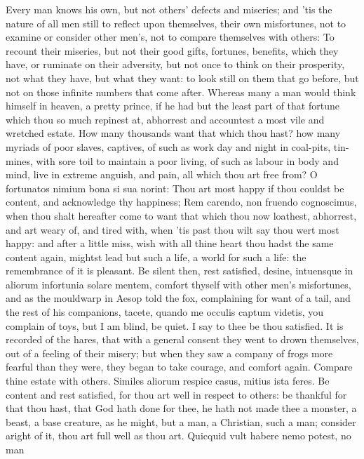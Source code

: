{Every man knows his own, but not others' defects and miseries;
and 'tis the nature of all men still to reflect upon themselves, their
own misfortunes, not to examine or consider other men's, not to compare
themselves with others: To recount their miseries, but not their good
gifts, fortunes, benefits, which they have, or ruminate on their
adversity, but not once to think on their prosperity, not what they
have, but what they want: to look still on them that go before, but not
on those infinite numbers that come after. Whereas many a man
would think himself in heaven, a pretty prince, if he had but the least
part of that fortune which thou so much repinest at, abhorrest and
accountest a most vile and wretched estate. How many thousands want
that which thou hast? how many myriads of poor slaves, captives, of
such as work day and night in coal-pits, tin-mines, with sore toil to
maintain a poor living, of such as labour in body and mind, live in
extreme anguish, and pain, all which thou art free from? O fortunatos
nimium bona si sua norint: Thou art most happy if thou couldst be
content, and acknowledge thy happiness; Rem carendo, non fruendo
cognoscimus, when thou shalt hereafter come to want that which thou now
loathest, abhorrest, and art weary of, and tired with, when 'tis past
thou wilt say thou wert most happy: and after a little miss, wish with
all thine heart thou hadst the same content again, mightst lead but
such a life, a world for such a life: the remembrance of it is
pleasant. Be silent then, rest satisfied, desine, intuensque in
aliorum infortunia solare mentem, comfort thyself with other men's
misfortunes, and as the mouldwarp in Aesop told the fox, complaining
for want of a tail, and the rest of his companions, tacete, quando me
occulis captum videtis, you complain of toys, but I am blind, be quiet.
I say to thee be thou satisfied. It is recorded of the hares,
that with a general consent they went to drown themselves, out of a
feeling of their misery; but when they saw a company of frogs more
fearful than they were, they began to take courage, and comfort again.
Compare thine estate with others. Similes aliorum respice casus, mitius
ista feres. Be content and rest satisfied, for thou art well in respect
to others: be thankful for that thou hast, that God hath done for thee,
he hath not made thee a monster, a beast, a base creature, as he might,
but a man, a Christian, such a man; consider aright of it, thou art
full well as thou art. Quicquid vult habere nemo potest, no man
}
